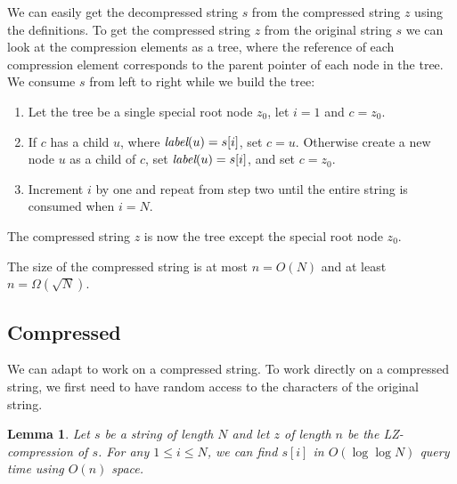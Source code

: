 \documentclass[a4]{article}
\newtheorem{lemma}{Lemma}
\begin{document}
We can easily get the decompressed string $s$ from the compressed string $z$ using the definitions. To get the compressed string $z$ from the original string $s$ we can look at the compression elements as a tree, where the reference of each compression element corresponds to the parent pointer of each node in the tree. We consume $s$ from left to right while we build the tree:
\begin{enumerate}
\item Let the tree be a single special root node $z_0$, let $i = 1$ and $c=z_0$.
\item If $c$ has a child $u$, where $\textit{label}(u)=s[i]$, set $c=u$. Otherwise create a new node $u$ as a child of $c$, set $\textit{label}(u)=s[i]$, and set $c=z_0$.
\item Increment $i$ by one and repeat from step two until the entire string is consumed when $i = N$.
\end{enumerate}
The compressed string $z$ is now the tree except the special root node $z_0$.

The size of the compressed string is at most $n=O(N)$ and at least $n=\Omega(\sqrt{N})$.

\subsection{Compressed \label{sec:lz-iterate-forward}}

We can adapt  to work on a compressed string. To work directly on a compressed string, we first need to have random access to the characters of the original string.

\begin{lemma}
\label{lem:lz-random-access}
Let $s$ be a string of length $N$ and let $z$ of length $n$ be the LZ-compression of $s$. For any $1 \leq i \leq N$, we can find $s[i]$ in $O(\log\log N)$ query time using $O(n)$ space.
\end{lemma}
\end{document}

